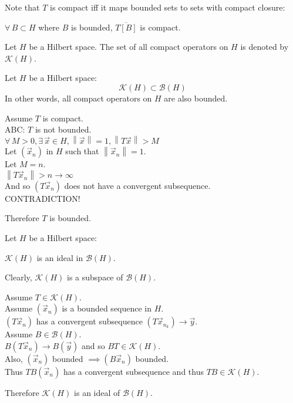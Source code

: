 \documentclass[letterpaper,12pt,fleqn]{article}
\newcommand{\vx}{\vec{x}}
\newcommand{\vy}{\vec{y}}
\newcommand{\norm}[1]{\left\|#1\right\|}
\newcommand{\mb}{\mathcal{B}}
\newcommand{\mk}{\mathcal{K}}
\begin{document}
Note that $T$ is compact iff it maps bounded sets to sets with compact
closure:

\qquad$\forall\,B\subset H$ where $B$ is bounded, $\overline{T[B]}$ is compact.

\begin{notation}
  Let $H$ be a Hilbert space. The set of all compact operators on $H$ is
  denoted by $\mk(H)$.
\end{notation}

\begin{theorem}
  Let $H$ be a Hilbert space:
  \[\mk(H)\subset\mb(H)\]
  In other words, all compact operators on $H$ are also bounded.
\end{theorem}

\newpage

\begin{theproof}
  Assume $T$ is compact. \\
  ABC: $T$ is not bounded. \\
  $\forall\,M>0,\exists\,\vx\in H,\norm{\vx}=1,\norm{T\vx}>M$ \\
  Let $(\vx_n)$ in $H$ such that $\norm{\vx_n}=1$. \\
  Let $M=n$. \\
  $\norm{T\vx_n}>n\to\infty$ \\
  And so $(T\vx_n)$ does not have a convergent subsequence. \\
  CONTRADICTION!

  Therefore $T$ is bounded.
\end{theproof}

\begin{theorem}
  Let $H$ be a Hilbert space:
  
  \qquad$\mk(H)$ is an ideal in $\mb(H)$.
\end{theorem}

\begin{theproof}
  Clearly, $\mk(H)$ is a subspace of $\mb(H)$.

  Assume $T\in\mk(H)$. \\
  Assume $(\vx_n)$ is a bounded sequence in $H$. \\
  $(T\vx_n)$ has a convergent subsequence $(T\vx_{n_k})\to\vy$. \\
  Assume $B\in\mb(H)$. \\
  $B(T\vx_n)\to B(\vy)$ and so $BT\in\mk(H)$. \\
  Also, $(\vx_n)$ bounded $\implies(B\vx_n)$ bounded. \\
  Thus $TB(\vx_n)$ has a convergent subsequence and thus $TB\in\mk(H)$.

  Therefore $\mk(H)$ is an ideal of $\mb(H)$.
\end{theproof}
\end{document}
